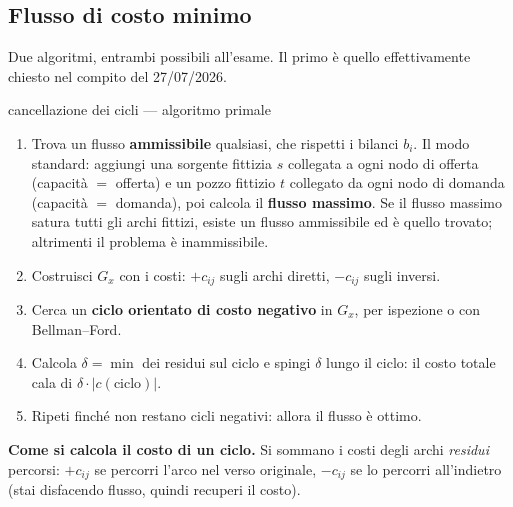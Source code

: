 \documentclass[11pt,a4paper]{article}
\begin{document}
\subsection{Flusso di costo minimo}

Due algoritmi, entrambi possibili all'esame. Il primo è quello effettivamente chiesto
nel compito del 27/07/2026.

\begin{ric}{cancellazione dei cicli --- algoritmo primale}
\begin{enumerate}
\item Trova un flusso \textbf{ammissibile} qualsiasi, che rispetti i bilanci $b_i$.
      Il modo standard: aggiungi una sorgente fittizia $s$ collegata a ogni nodo di offerta
      (capacità $=$ offerta) e un pozzo fittizio $t$ collegato da ogni nodo di domanda
      (capacità $=$ domanda), poi calcola il \textbf{flusso massimo}.
      Se il flusso massimo satura tutti gli archi fittizi, esiste un flusso ammissibile
      ed è quello trovato; altrimenti il problema è inammissibile.
\item Costruisci $G_x$ con i costi: $+c_{ij}$ sugli archi diretti, $-c_{ij}$ sugli inversi.
\item Cerca un \textbf{ciclo orientato di costo negativo} in $G_x$, per ispezione o con
      Bellman--Ford.
\item Calcola $\delta = \min$ dei residui sul ciclo e spingi $\delta$ lungo il ciclo:
      il costo totale cala di $\delta \cdot |c(\text{ciclo})|$.
\item Ripeti finché non restano cicli negativi: allora il flusso è ottimo.
\end{enumerate}
\end{ric}

\begin{idea}
\textbf{Come si calcola il costo di un ciclo.} Si sommano i costi degli archi \emph{residui}
percorsi: $+c_{ij}$ se percorri l'arco nel verso originale, $-c_{ij}$ se lo percorri
all'indietro (stai disfacendo flusso, quindi recuperi il costo).
\end{idea}
\end{document}
